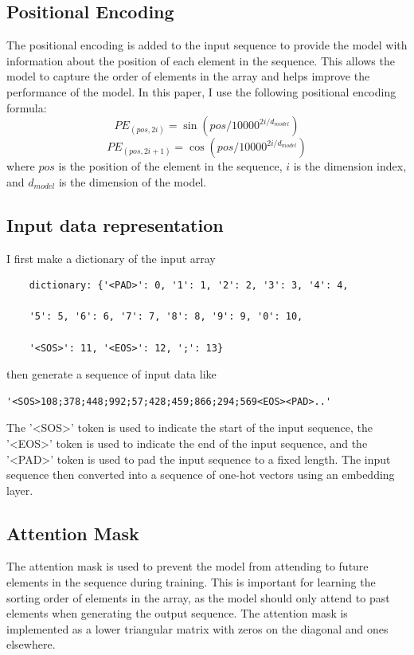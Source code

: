 \documentclass{article}
\begin{document}
\subsection{Positional Encoding}
The positional encoding is added to the input sequence to provide the model with information about the position of each element in the sequence. This allows the model to capture the order of elements in the array and helps improve the performance of the model.
In this paper, I use the following positional encoding formula:
\begin{equation}
    PE_{(pos, 2i)} = \sin(pos / 10000^{2i / d_{model}})
\end{equation}
\begin{equation}
    PE_{(pos, 2i+1)} = \cos(pos / 10000^{2i / d_{model}})
\end{equation}
where $pos$ is the position of the element in the sequence, $i$ is the dimension index, and $d_{model}$ is the dimension of the model.

\subsection{Input data representation}
I first make a dictionary of the input array
\begin{verbatim}
    dictionary: {'<PAD>': 0, '1': 1, '2': 2, '3': 3, '4': 4,
    
    '5': 5, '6': 6, '7': 7, '8': 8, '9': 9, '0': 10,
    
    '<SOS>': 11, '<EOS>': 12, ';': 13}
\end{verbatim}
then generate a sequence of input data like 
\begin{verbatim}
'<SOS>108;378;448;992;57;428;459;866;294;569<EOS><PAD>..' 
\end{verbatim}
The '<SOS>' token is used to indicate the start of the input sequence, the '<EOS>' token is used to indicate the end of the input sequence, and the '<PAD>' token is used to pad the input sequence to a fixed length. The input sequence then converted into a sequence of one-hot vectors using an embedding layer.

\subsection{Attention Mask}

The attention mask is used to prevent the model from attending to future elements in the sequence during training. This is important for learning the sorting order of elements in the array, as the model should only attend to past elements when generating the output sequence. The attention mask is implemented as a lower triangular matrix with zeros on the diagonal and ones elsewhere.
\end{document}
